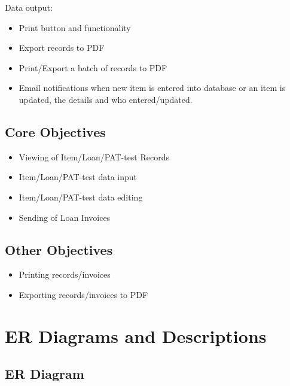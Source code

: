 \documentclass[a4paper,12pt]{report}
\begin{document}
\noindent Data output:
\begin{itemize}
    \item Print button and functionality
    \item Export records to PDF
    \item Print/Export a batch of records to PDF
    \item Email notifications when new item is entered into database or an item is updated, the details and who entered/updated.
\end{itemize}


\subsection{Core Objectives}

\begin{itemize}
    \item Viewing of Item/Loan/PAT-test Records
    \item Item/Loan/PAT-test data input
    \item Item/Loan/PAT-test data editing
    \item Sending of Loan Invoices
\end{itemize}

\subsection{Other Objectives}

\begin{itemize}
    \item Printing records/invoices
    \item Exporting records/invoices to PDF
\end{itemize}

\section{ER Diagrams and Descriptions}

\subsection{ER Diagram}
\end{document}
